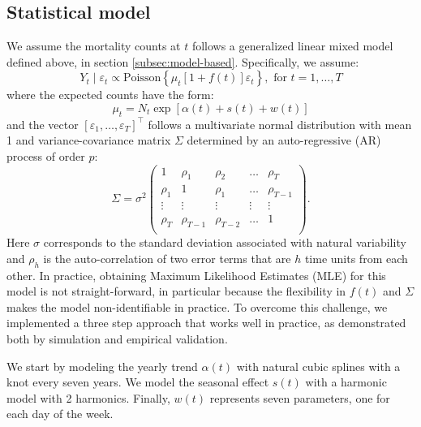 \documentclass[11pt]{article}
\begin{document}
\subsection{Statistical model}
\label{subsec:statistical-model}
We assume the mortality counts at $t$ follows a generalized linear mixed model defined above, in section \ref{subsec:model-based}. Specifically, we assume:
\begin{equation*}
    Y_t \mid \varepsilon_t \propto \mbox{Poisson}\left\{ \mu_t 
    \left[1 + f(t)\right]  \varepsilon_t \right\}, \mbox{ for } t = 1, \dots,T 
\end{equation*}
where the expected counts have the form:
\begin{equation*}
    \mu_t =N_t  \exp[\alpha(t) + s(t) + w(t)]
\end{equation*}
and the vector $[\varepsilon_1, \ldots, \varepsilon_T]^\top$ follows a multivariate normal distribution with mean 1 and variance-covariance matrix $\Sigma$ determined by an auto-regressive (AR) process of order $p$:
\begin{equation*}
    \Sigma = \sigma^2
    \begin{pmatrix} 1 & \rho_1 & \rho_{2} & \dots & \rho_{T} \\ 
    \rho_{1} & 1 & \rho_{1} & \ldots & \rho_{T-1} \\
    \vdots & \vdots & \vdots & \vdots & \vdots \\
    \rho_{T} & \rho_{T-1} & \rho_{T-2} & \dots & 1 \\ 
    \end{pmatrix}.
\end{equation*}
Here $\sigma$ corresponds to the standard deviation associated with natural variability and $\rho_h$ is the auto-correlation of two error terms that are $h$ time units from each other. In practice, obtaining Maximum Likelihood Estimates (MLE) for this model is not straight-forward, in particular because the flexibility in $f(t)$ and $\Sigma$ makes the model non-identifiable in practice. To overcome this challenge, we implemented a three step approach that works well in practice, as demonstrated both by simulation and empirical validation.

We start by modeling the yearly trend $\alpha(t)$ with natural cubic splines with a knot every seven years. We model the seasonal effect $s(t)$ with a harmonic model with 2 harmonics. Finally, $w(t)$
represents seven parameters, one for each day of the week. 
\end{document}
